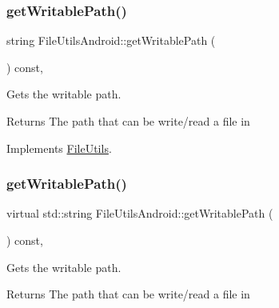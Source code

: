 \mbox{\label{classFileUtilsAndroid_a51cf37a9916441127b8bb349ab037f23}} 
\subsubsection{\texorpdfstring{get\+Writable\+Path()}{getWritablePath()}\hspace{0.1cm}{\footnotesize\ttfamily [1/2]}}
{\footnotesize\ttfamily string File\+Utils\+Android\+::get\+Writable\+Path (\begin{DoxyParamCaption}{ }\end{DoxyParamCaption}) const\hspace{0.3cm}{\ttfamily [override]}, {\ttfamily [virtual]}}

Gets the writable path. \begin{DoxyReturn}{Returns}
The path that can be write/read a file in 
\end{DoxyReturn}


Implements \hyperlink{classFileUtils_aab14c8d4e292f7a1e9b2b2908d02a0ed}{File\+Utils}.

\mbox{\label{classFileUtilsAndroid_a98e6cf3fe3d7023fc5adb965c851be85}} 
\subsubsection{\texorpdfstring{get\+Writable\+Path()}{getWritablePath()}\hspace{0.1cm}{\footnotesize\ttfamily [2/2]}}
{\footnotesize\ttfamily virtual std\+::string File\+Utils\+Android\+::get\+Writable\+Path (\begin{DoxyParamCaption}{ }\end{DoxyParamCaption}) const\hspace{0.3cm}{\ttfamily [override]}, {\ttfamily [virtual]}}

Gets the writable path. \begin{DoxyReturn}{Returns}
The path that can be write/read a file in 
\end{DoxyReturn}


